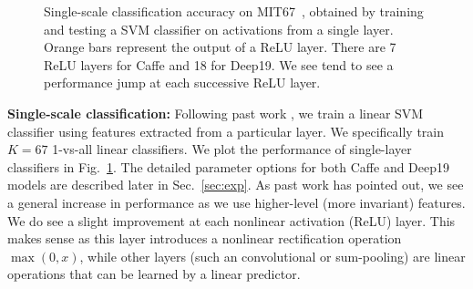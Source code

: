 \documentclass[10pt,twocolumn,letterpaper]{article}
\begin{document}
\begin{figure}[htbp]
\centering
\caption{Single-scale classification accuracy on MIT67~\cite{MIT67}, obtained by training and testing a SVM classifier on activations from a single layer. Orange bars represent the output of a ReLU layer. There are 7 ReLU layers for Caffe and 18 for Deep19. We see tend to see a performance jump at each successive ReLU layer.}
\label{fig:layer_MIT67}
\end{figure}

{\bf Single-scale classification:} Following past work \cite{cnn_baseline}, we train a linear SVM classifier using features extracted from a particular layer. We specifically train $K=67$ 1-vs-all linear classifiers.
We plot the performance of single-layer classifiers in Fig.~\ref{fig:layer_MIT67}. The detailed parameter options for both Caffe and Deep19 models are described later in Sec.~\ref{sec:exp}. As past work has pointed out, we see a general increase in performance as we use higher-level (more invariant) features. We do see a slight improvement at each nonlinear activation (ReLU) layer. This makes sense as this layer introduces a nonlinear rectification operation $\max(0,x)$, while other layers (such an convolutional or sum-pooling) are linear operations that can be learned by a linear predictor.
\end{document}
